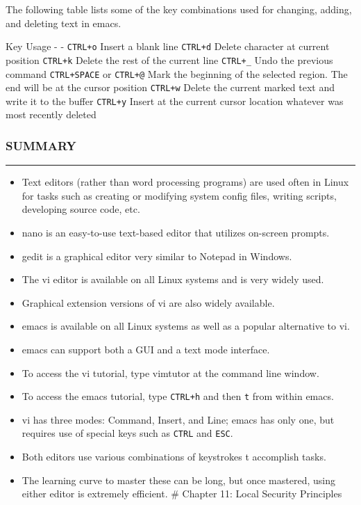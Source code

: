 The following table lists some of the key combinations used for
changing, adding, and deleting text in emacs.

Key \textbar{} Usage - \textbar{} - \texttt{CTRL+o} \textbar{} Insert a
blank line \texttt{CTRL+d} \textbar{} Delete character at current
position \texttt{CTRL+k} \textbar{} Delete the rest of the current line
\texttt{CTRL+\_} \textbar{} Undo the previous command
\texttt{CTRL+SPACE} or \texttt{CTRL+@} \textbar{} Mark the beginning of
the selected region. The end will be at the cursor position
\texttt{CTRL+w} \textbar{} Delete the current marked text and write it
to the buffer \texttt{CTRL+y} \textbar{} Insert at the current cursor
location whatever was most recently deleted

\subsubsection{SUMMARY}\label{summary-8}

\begin{center}\rule{3in}{0.4pt}\end{center}

\begin{itemize}
\itemsep1pt\parskip0pt
\item
  Text editors (rather than word processing programs) are used often in
  Linux for tasks such as creating or modifying system config files,
  writing scripts, developing source code, etc.
\item
  nano is an easy-to-use text-based editor that utilizes on-screen
  prompts.
\item
  gedit is a graphical editor very similar to Notepad in Windows.
\item
  The vi editor is available on all Linux systems and is very widely
  used.
\item
  Graphical extension versions of vi are also widely available.
\item
  emacs is available on all Linux systems as well as a popular
  alternative to vi.
\item
  emacs can support both a GUI and a text mode interface.
\item
  To access the vi tutorial, type vimtutor at the command line window.
\item
  To access the emacs tutorial, type \texttt{CTRL+h} and then \texttt{t}
  from within emacs.
\item
  vi has three modes: Command, Insert, and Line; emacs has only one, but
  requires use of special keys such as \texttt{CTRL} and \texttt{ESC}.
\item
  Both editors use various combinations of keystrokes t accomplish
  tasks.
\item
  The learning curve to master these can be long, but once mastered,
  using either editor is extremely efficient. \# Chapter 11: Local
  Security Principles
\end{itemize}

